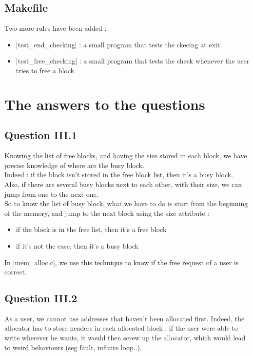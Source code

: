 \documentclass[twoside]{article}
\begin{document}
\subsection{Makefile}
Two more rules have been added :
\begin{itemize}
	\item |test_end_checking| : a small program that tests the ckecing at exit
	\item |test_free_checking| : a small program that tests the check whenever
		the user tries to free a block.
\end{itemize}

\section{The answers to the questions}
\subsection{Question III.1}
Knowing the list of free blocks, and having the size stored in each block,
we have precise knowledge of where are the busy block.\\

Indeed : if the block isn't stored in the free block list, then it's a busy
block. Also, if there are several busy blocks next to each other, with their
size, we can jump from one to the next one.\\

So to know the list of busy block, what we have to do is start from the
beginning of the memory, and jump to the next block using the size attribute :
\begin{itemize}
	\item if the block is in the free list, then it's a free block
	\item if it's not the case, then it's a busy block
\end{itemize}

In |mem_alloc.c|, we use this technique to know if the free request of a user
is correct.

\subsection{Question III.2}
As a user, we cannot use addresses that haven't been allocated first. Indeed,
the allocator has to store headers in each allocated block ; if the user were
able to write wherever he wants, it would then screw up the allocator, which
would lead to weird behaviours (seg fault, infinite loop..).\\
\end{document}
